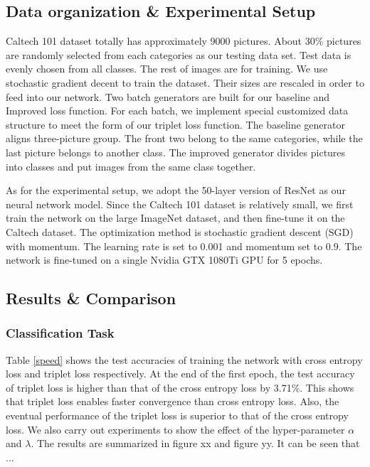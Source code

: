 \documentclass[11pt,onecolumn,letterpaper]{article}
\begin{document}
\subsection{Data organization \& Experimental Setup}

Caltech 101 dataset totally has approximately 9000 pictures. About 30\% pictures are randomly selected from each categories as our testing data set. Test data is evenly chosen from all classes. The rest of images are for training. We use stochastic gradient decent to train the dataset. Their sizes are rescaled in order to feed into our network. Two batch generators are built for our baseline and Improved loss function. For each batch, we implement special customized data structure to meet the form of our triplet loss function. The baseline generator aligns three-picture group. The front two belong to the same categories, while the last picture belongs to another class. The improved generator divides pictures into classes and put images from the same class together.

As for the experimental setup, we adopt the 50-layer version of ResNet as our neural network model. Since the Caltech 101 dataset is relatively small, we first train the network on the large ImageNet dataset, and then fine-tune it on the Caltech dataset. The optimization method is stochastic gradient descent (SGD) with momentum. The learning rate is set to 0.001 and momentum set to 0.9. The network is fine-tuned on a single Nvidia GTX 1080Ti GPU for 5 epochs.
\subsection{Results \& Comparison}

\subsubsection{Classification Task}
\begin{table}[htbp]
\renewcommand{\arraystretch}{1.3}
\centering
\caption{Comparision of Convergence Speed}
\label{speed}
\end{table}
Table \ref{speed} shows the test accuracies of training the network with cross entropy loss and triplet loss respectively. At the end of the first epoch, the test accuracy of triplet loss is higher than that of the cross entropy loss by 3.71\%. This shows that triplet loss enables faster convergence than cross entropy loss. Also, the eventual performance of the triplet loss is superior to that of the cross entropy loss.
We also carry out experiments to show the effect of the hyper-parameter $\alpha$ and $\lambda$. The results are summarized in figure xx and figure yy. It can be seen that ...
\end{document}
